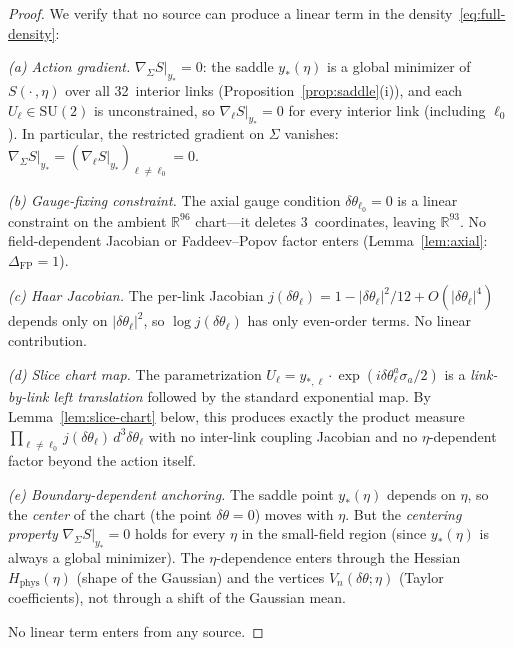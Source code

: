 \documentclass[11pt]{article}
\theoremstyle{definition}
\newcommand{\SU}{\mathrm{SU}}
\newcommand{\R}{\mathbb{R}}
\begin{document}
\begin{proof}
We verify that no source can produce a linear term
in the density~\eqref{eq:full-density}:

\emph{(a) Action gradient.}
$\nabla_\Sigma S|_{y_*}=0$: the saddle $y_*(\eta)$ is a global
minimizer of $S(\cdot\,,\eta)$ over all 32~interior links
(Proposition~\ref{prop:saddle}(i)), and each $U_\ell\in\SU(2)$
is unconstrained, so $\nabla_\ell S|_{y_*}=0$ for every
interior link (including $\ell_0$).  In particular, the
restricted gradient on $\Sigma$ vanishes:
$\nabla_\Sigma S|_{y_*}
=(\nabla_\ell S|_{y_*})_{\ell\ne\ell_0}=0$.

\emph{(b) Gauge-fixing constraint.}
The axial gauge condition $\delta\theta_{\ell_0}=0$ is a
linear constraint on the ambient $\R^{96}$ chart---it
deletes 3~coordinates, leaving $\R^{93}$.  No field-dependent
Jacobian or Faddeev--Popov factor enters
(Lemma~\ref{lem:axial}: $\Delta_{\mathrm{FP}}=1$).

\emph{(c) Haar Jacobian.}
The per-link Jacobian $j(\delta\theta_\ell)
=1-|\delta\theta_\ell|^2/12+O(|\delta\theta_\ell|^4)$
depends only on $|\delta\theta_\ell|^2$, so
$\log j(\delta\theta_\ell)$ has only even-order terms.
No linear contribution.

\emph{(d) Slice chart map.}
The parametrization $U_\ell=y_{*,\ell}\cdot
\exp(i\delta\theta_\ell^a\sigma_a/2)$ is a
\emph{link-by-link left translation} followed by the
standard exponential map.  By Lemma~\ref{lem:slice-chart}
below, this produces exactly the product measure
$\prod_{\ell\ne\ell_0}j(\delta\theta_\ell)\,d^3\delta\theta_\ell$
with no inter-link coupling Jacobian and no
$\eta$-dependent factor beyond the action itself.

\emph{(e) Boundary-dependent anchoring.}
The saddle point $y_*(\eta)$ depends on $\eta$, so the
\emph{center} of the chart (the point $\delta\theta=0$)
moves with $\eta$.  But the \emph{centering property}
$\nabla_\Sigma S|_{y_*}=0$ holds for every $\eta$
in the small-field region (since $y_*(\eta)$ is always a global
minimizer).  The $\eta$-dependence enters through the
Hessian $H_{\mathrm{phys}}(\eta)$ (shape of the Gaussian)
and the vertices $V_n(\delta\theta;\eta)$ (Taylor coefficients),
not through a shift of the Gaussian mean.

No linear term enters from any source.
\end{proof}
\end{document}
